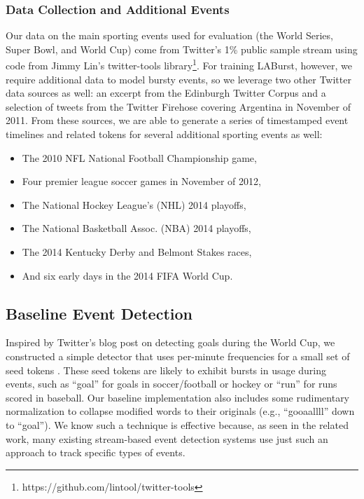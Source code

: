 \documentclass{sig-alternate}
\begin{document}
\subsubsection{Data Collection and Additional Events}

Our data on the main sporting events used for evaluation (the World Series, Super Bowl, and World Cup) come from Twitter's 1\% public sample stream using code from Jimmy Lin's twitter-tools library\footnote{https://github.com/lintool/twitter-tools}.
For training LABurst, however, we require additional data to model bursty events, so we leverage two other Twitter data sources as well: an excerpt from the Edinburgh Twitter Corpus \cite{Petrovic:2010:ETC:1860667.1860680} and a selection of tweets from the Twitter Firehose covering Argentina in November of 2011.
From these sources, we are able to generate a series of timestamped event timelines and related tokens for several additional sporting events as well: %
%
\begin{itemize} 
\item The 2010 NFL National Football Championship game, 
\item Four premier league soccer games in November of 2012, %
\item The National Hockey League's (NHL) 2014 playoffs, 
\item The National Basketball Assoc. (NBA) 2014 playoffs, 
\item The 2014 Kentucky Derby and Belmont Stakes races, 
\item And six early days in the 2014 FIFA World Cup.
\end{itemize}

\subsection{Baseline Event Detection}

Inspired by Twitter's blog post on detecting goals during the World Cup, we constructed a simple detector that uses per-minute frequencies for a small set of seed tokens \cite{Cipriani2014}. 
These seed tokens are likely to exhibit bursts in usage during events, such as ``goal'' for goals in soccer/football or hockey or ``run'' for runs scored in baseball.
Our baseline implementation also includes some rudimentary normalization to collapse modified words to their originals (e.g., ``gooaallll'' down to ``goal'').
We know such a technique is effective because, as seen in the related work, many existing stream-based event detection systems use just such an approach to track specific types of events.
\end{document}
